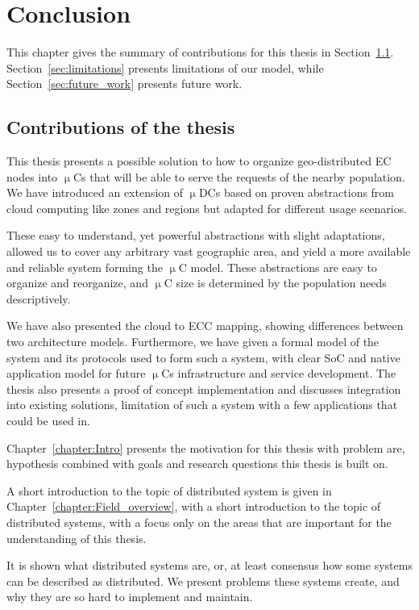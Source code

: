 \chapter{Conclusion}\label{chapter:Conclusion}
%
This chapter gives the summary of contributions for this thesis in Section~\ref{sec:summary_of_contributions}. Section~\ref{sec:limitations} presents limitations of our model, while Section~\ref{sec:future_work} presents future work.
%
%
\section{Contributions of the thesis}\label{sec:summary_of_contributions}
%
This thesis presents a possible solution to how to organize geo-distributed EC nodes into $\upmu$Cs that will be able to serve the requests of the nearby population. We have introduced an extension of $\upmu$DCs based on proven abstractions from cloud computing like zones and regions but adapted for different usage scenarios.

These easy to understand, yet powerful abstractions with slight adaptations, allowed us to cover any arbitrary vast geographic area, and yield a more available and reliable system forming the $\upmu$C model. These abstractions are easy to organize and reorganize, and $\upmu$C size is determined by the population needs descriptively. 

We have also presented the cloud to ECC mapping, showing differences between two architecture models. Furthermore, we have given a formal model of the system and its protocols used to form such a system, with clear SoC and native application model for future $\upmu$Cs infrastructure and service development. The thesis also presents a proof of concept implementation and discusses integration into existing solutions, limitation of such a system with a few applications that could be used in.

Chapter~\ref{chapter:Intro} presents the motivation for this thesis with problem are, hypothesis combined with goals and research questions this thesis is built on.

A short introduction to the topic of distributed system is given in Chapter~\ref{chapter:Field_overview}, with a short introduction to the topic of distributed systems, with a focus only on the areas that are important for the understanding of this thesis. 

It is shown what distributed systems are, or, at least consensus how some systems can be described as distributed. We present problems these systems create, and why they are so hard to implement and maintain. 

